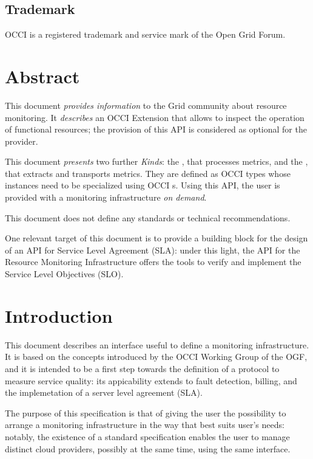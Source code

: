 \documentclass[10pt]{article}  %
\begin{document}
\subsection*{Trademark}

OCCI is a registered trademark and service mark of the Open Grid Forum. 

\section*{Abstract}

This document {\em provides information} to the Grid community about resource monitoring. It {\em describes} an OCCI Extension that allows to inspect the operation of functional resources; the provision of this API is considered as optional for the provider.

This document {\em presents} two further {\em Kinds}: the \sens, that processes metrics, and the \coll, that extracts and transports metrics. They are defined as OCCI types whose instances need to be specialized using OCCI \mi s. Using this API, the user is provided with a monitoring infrastructure {\em on demand}.

This document does not define any standards or technical recommendations.

One relevant target of this document is to provide a building block for the design of an API for Service Level Agreement (SLA): under this light, the API for the Resource Monitoring Infrastructure offers the tools to verify and implement the Service Level Objectives (SLO).

\tableofcontents

\newpage

\section{Introduction}

This document describes an interface useful to define a monitoring infrastructure. It is based on the concepts introduced by the OCCI Working Group of the OGF, and it is intended to be a first step towards the definition of a protocol to measure service quality: its appicability extends to fault detection, billing, and the implemetation of a server level agreement (SLA).

The purpose of this specification is that of giving the user the possibility to arrange a monitoring infrastructure in the way that best suits user's needs: notably, the existence of a standard specification enables the user to manage distinct cloud providers, possibly at the same time, using the same interface.
\end{document}
